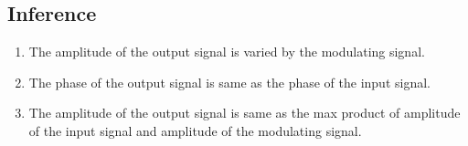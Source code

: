 \subsection*{Inference}
\begin{enumerate}
    \item The amplitude of the output signal is varied by the modulating signal.
    \item The phase of the output signal is same as the phase of the input signal.
    \item The amplitude of the output signal is same as the max product of amplitude of the input signal and amplitude of the modulating signal.
\end{enumerate}